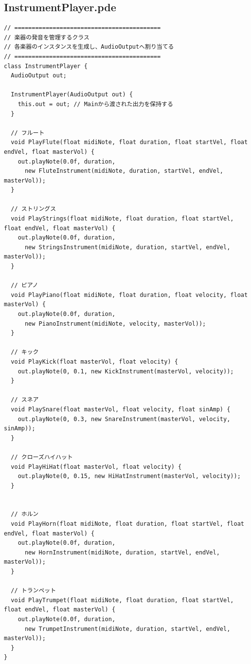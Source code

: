 \subsection{InstrumentPlayer.pde}
\begin{lstlisting}[caption={InstrumentPlayer.pde}, label={lst:proc_player}]
// ==========================================
// 楽器の発音を管理するクラス
// 各楽器のインスタンスを生成し、AudioOutputへ割り当てる
// ==========================================
class InstrumentPlayer {
  AudioOutput out;

  InstrumentPlayer(AudioOutput out) {
    this.out = out; // Mainから渡された出力を保持する
  }

  // フルート
  void PlayFlute(float midiNote, float duration, float startVel, float endVel, float masterVol) {
    out.playNote(0.0f, duration, 
      new FluteInstrument(midiNote, duration, startVel, endVel, masterVol));
  }
  
  // ストリングス
  void PlayStrings(float midiNote, float duration, float startVel, float endVel, float masterVol) {
    out.playNote(0.0f, duration, 
      new StringsInstrument(midiNote, duration, startVel, endVel, masterVol));
  }
  
  // ピアノ
  void PlayPiano(float midiNote, float duration, float velocity, float masterVol) {
    out.playNote(0.0f, duration, 
      new PianoInstrument(midiNote, velocity, masterVol));
  }
   
  // キック
  void PlayKick(float masterVol, float velocity) {
    out.playNote(0, 0.1, new KickInstrument(masterVol, velocity));
  }
  
  // スネア
  void PlaySnare(float masterVol, float velocity, float sinAmp) {
    out.playNote(0, 0.3, new SnareInstrument(masterVol, velocity, sinAmp));
  }
  
  // クローズハイハット
  void PlayHiHat(float masterVol, float velocity) {
    out.playNote(0, 0.15, new HiHatInstrument(masterVol, velocity));
  }
  
  
  // ホルン
  void PlayHorn(float midiNote, float duration, float startVel, float endVel, float masterVol) {
    out.playNote(0.0f, duration, 
      new HornInstrument(midiNote, duration, startVel, endVel, masterVol));
  }
  
  // トランペット
  void PlayTrumpet(float midiNote, float duration, float startVel, float endVel, float masterVol) {
    out.playNote(0.0f, duration, 
      new TrumpetInstrument(midiNote, duration, startVel, endVel, masterVol));
  }
}
\end{lstlisting}

